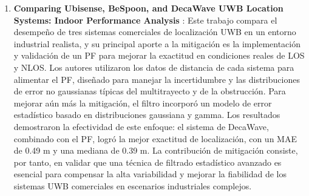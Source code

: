 \begin{enumerate}
    \item \textbf{Comparing Ubisense, BeSpoon, and DecaWave UWB Location Systems: Indoor Performance Analysis} \cite{Falcone2012}: Este trabajo compara el desempeño de tres sistemas comerciales de localización UWB en un entorno industrial realista, y su principal aporte a la mitigación es la implementación y validación de un PF para mejorar la exactitud en condiciones reales de LOS y NLOS. Los autores utilizaron los datos de distancia de cada sistema para alimentar el PF, diseñado para manejar la incertidumbre y las distribuciones de error no gaussianas típicas del multitrayecto y de la obstrucción. Para mejorar aún más la mitigación, el filtro incorporó un modelo de error estadístico basado en distribuciones gaussiana y gamma. Los resultados demostraron la efectividad de este enfoque: el sistema de DecaWave, combinado con el PF, logró la mejor exactitud de localización, con un MAE de 0.49 m y una mediana de 0.39 m. La contribución de mitigación consiste, por tanto, en validar que una técnica de filtrado estadístico avanzado es esencial para compensar la alta variabilidad y mejorar la fiabilidad de los sistemas UWB comerciales en escenarios industriales complejos.
\end{enumerate}
%
